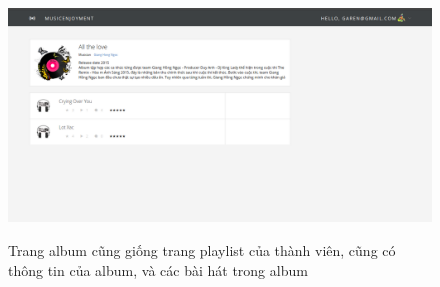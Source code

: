\documentclass[12pt,a4paper,oneside,openright]{article}
\numberwithin{subsection}{section}
\theoremstyle{definition}
\theoremstyle{plain}
\theoremstyle{definition}
\theoremstyle{definition}
\theoremstyle{remark}
\theoremstyle{definition}
\begin{document}
\begin{figure}[h!]
  \caption{Trang album cũng giống trang playlist của thành viên, cũng có thông tin của album, và các bài hát trong album}
  \includegraphics[width=\textwidth]{album}
  \label{fg:album}
\end{figure}
\end{document}
